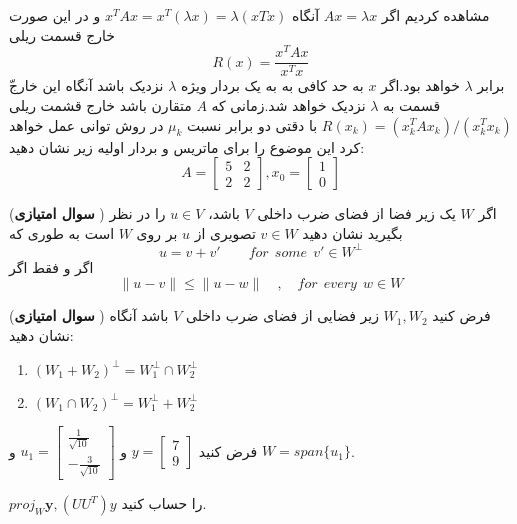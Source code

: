 \documentclass{article}
\begin{document}
	مشاهده کردیم اگر 
	$Ax=\lambda x$
	آنگاه 
	$x^TAx=x^T(\lambda x)=\lambda(xTx)$
	و در این صورت خارج قسمت ریلی 
	$$R(x)=\frac{x^TAx}{x^Tx}$$
	ّبرابر
	$\lambda$
	خواهد بود.اگر 
	$x$
	به حد کافی به به یک بردار ویژه 
	$\lambda$
	نزدیک باشد آنگاه این خارج قسمت به 
	$\lambda$
	نزدیک خواهد شد.زمانی که 
	$A$
	متقارن باشد خارج قشمت ریلی 
	$R(x_k)=(x^T_kAx_k)/(x^T_kx_k)$
	با دقتی دو برابر نسبت 
	$\mu_k$
	در روش توانی عمل خواهد کرد این موضوع را برای ماتریس و بردار اولیه زیر نشان دهید:
	$$A=\begin{bmatrix}
	5&2\\
	2&2
	\end{bmatrix},x_0=\begin{bmatrix}
	1\\
	0
	\end{bmatrix}$$
	
	({\bf سوال امتیازی })
	اگر 
	$W$
	یک زیر فضا از فضای ضرب داخلی 
	$V$
	باشد،
	$u\in V$
	را در نظر بگیرید نشان دهید
	$v\in W$
	تصویری از 
	$u$
	بر روی 
	$W$
	است به طوری که   
	$$u=v+v'\qquad for\  \ some\ \ v' \in W^{\perp}$$
	اگر و فقط اگر 
	$$\parallel u-v\parallel \leq \parallel u-w\parallel\quad,\quad for \ \ every \ \ w\in W $$
	
	
	({\bf سوال امتیازی }) فرض کنید 
	$W_1,W_2$
	زیر فضایی از فضای ضرب داخلی 
	$V$
	باشد آنگاه نشان دهید:
	\begin{enumerate}
		\item $(W_1+W_2)^{\perp}=W_1^{\perp}\cap W_2^{\perp}$
		\item $(W_1\cap W_2)^{\perp}=W_1^{\perp}+W_2^{\perp}$
	\end{enumerate}
	
	
	
	 فرض کنید 
	$y=\begin{bmatrix}
	7\\
	9
	\end{bmatrix}$
	و 
	$u_1=\begin{bmatrix}
	\frac{1}{\sqrt{10}}\\
	-\frac{3}{\sqrt{10}}
	\end{bmatrix}$
	و 
	$W=span\{u_1\}$.
	
	
	$proj_W \boldsymbol{y},(UU^T)y$
	را حساب کنید.
	
\end{document}
